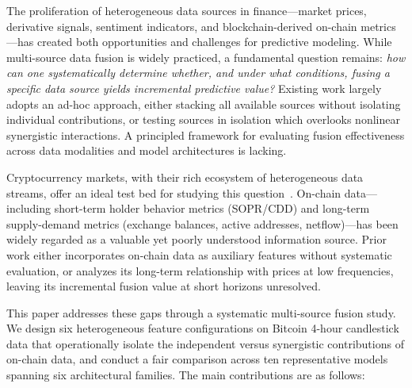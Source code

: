 \documentclass[a4paper]{cas-dc}
\begin{document}
The proliferation of heterogeneous data sources in finance---market prices, derivative signals, sentiment indicators, and blockchain-derived on-chain metrics---has created both opportunities and challenges for predictive modeling. While multi-source data fusion is widely practiced, a fundamental question remains: \textit{how can one systematically determine whether, and under what conditions, fusing a specific data source yields incremental predictive value?} Existing work largely adopts an ad-hoc approach, either stacking all available sources without isolating individual contributions, or testing sources in isolation which overlooks nonlinear synergistic interactions. A principled framework for evaluating fusion effectiveness across data modalities and model architectures is lacking.

Cryptocurrency markets, with their rich ecosystem of heterogeneous data streams, offer an ideal test bed for studying this question~\cite{urquhart2016,kristoufek2015}. On-chain data---including short-term holder behavior metrics (SOPR/CDD) and long-term supply-demand metrics (exchange balances, active addresses, netflow)---has been widely regarded as a valuable yet poorly understood information source. Prior work either incorporates on-chain data as auxiliary features without systematic evaluation, or analyzes its long-term relationship with prices at low frequencies, leaving its incremental fusion value at short horizons unresolved.

This paper addresses these gaps through a systematic multi-source fusion study. We design six heterogeneous feature configurations on Bitcoin 4-hour candlestick data that operationally isolate the independent versus synergistic contributions of on-chain data, and conduct a fair comparison across ten representative models spanning six architectural families. The main contributions are as follows:
\end{document}
